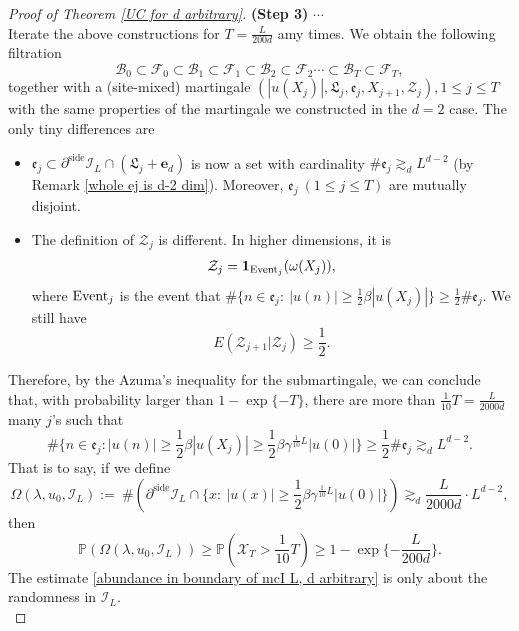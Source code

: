 \documentclass[11pt,reqno,UTF8,twoside]{amsart}
\newcommand{\event}{{\rm Event}}
\newcommand{\bfe}{\mathbf{e}}
\renewcommand{\P}{\mathbb{P}}
\newcommand{\mcB}{\mathcal{B}}
\newcommand{\mcF}{\mathcal{F}}
\newcommand{\mcI}{\mathcal{I}}
\newcommand{\mcX}{\mathcal{X}}
\newcommand{\mcZ}{\mathcal{Z}}
\newcommand{\partialside}{\partial^{\text{side}}}
\theoremstyle{definition}
\numberwithin{equation}{section}
\begin{document}
\begin{proof}[Proof of Theorem \ref{UC for d arbitrary}]
\noindent \textbf{{(Step 3)}} $\cdots$\\



Iterate the above constructions  for  $T=\frac{L}{200d}$ amy  times. We obtain the following filtration
\[\mcB_0\subset \mcF_0\subset \mcB_1\subset\mcF_1\subset  \mcB_2\subset\mcF_2\cdots \subset  \mcB_T \subset \mcF_T,\]
together with a (site-mixed) martingale $(|u(X_j)|,\mathfrak{L}_j,\mathfrak{e}_j, X_{j+1},\mcZ_j),1 \leq j\leq T$ with the same properties of the martingale we constructed in the  $d=2$ case. The only tiny differences are 
\begin{itemize}
  \item  $\mathfrak{e}_j \subset \partialside \mcI_L \cap (\mathfrak{L}_j+\bfe_d)$ is now a set with cardinality $\# \mathfrak{e}_j\gtrsim_d L^{d-2}$ (by Remark \ref{whole ej is d-2 dim}). Moreover, $\mathfrak{e}_j \ (1\leq j\leq T)$ are mutually disjoint.
  \item The definition of $\mcZ_j$ is different. In higher dimensions, it is 
   \begin{align*}
  \mcZ_j= \mathbf{1}_{\event_j}(\omega(X_j)), 
\end{align*} 
where $\event_j$ is the event that $\# \{ n\in \mathfrak{e}_j:\  |u(n)| \geq \frac{1}{2}\beta |u(X_j)| \} \geq \frac{1}{2}\# \mathfrak{e}_j$. We still have 
\[E(\mcZ_{j+1}|\mcZ_j)\geq \frac{1}{2}.\]

\end{itemize}

Therefore, by  the  Azuma's inequality for  the submartingale, we can conclude that,  with probability larger than $1-\exp\{-T\}$, there are more than $\frac{1}{10}T=\frac{L}{2000d}$ many  $j$'s  such that 
\[\# \{ n\in \mathfrak{e}_j: |u(n)| \geq \frac{1}{2}\beta |u(X_j)| \geq \frac{1}{2}\beta\gamma^{\frac{1}{10}L} |u(0)| \} \geq \frac{1}{2}\# \mathfrak{e}_j \gtrsim_d L^{d-2} .\] 
That is to say, if we define  
\[\Omega(\lambda,u_0,\mcI_L):= \ \#\left(  \partialside \mcI_L\cap \{ x: \ |u(x)| \geq  \frac{1}{2}\beta\gamma^{\frac{1}{10}L} |u(0)| \} \right) \gtrsim_d \frac{L}{2000d}\cdot L^{d-2},\]
then 
\begin{equation}\label{abundance in boundary of mcI L, d arbitrary}
  \P\left(\Omega(\lambda,u_0,\mcI_L) \right) \geq \P\left(\mcX_T > \frac{1}{10}T \right)\geq 1-\exp\{-\frac{L}{200d}\}.
\end{equation}
The   estimate \eqref{abundance in boundary of mcI L, d arbitrary} is only about the randomness in $\mcI_L$.\\


\end{proof}
\end{document}
